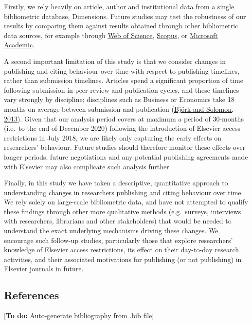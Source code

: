 \documentclass[
]{article}
\begin{document}
Firstly, we rely heavily on article, author and institutional data from a single bibliometric database, Dimensions. Future studies may test the robustness of our results by comparing them against results obtained through other bibliometric data sources, for example through \href{https://www.webofknowledge.com/}{Web of Science}, \href{https://www.scopus.com}{Scopus}, or \href{https://academic.microsoft.com}{Microsoft Academic}.

A second important limitation of this study is that we consider changes in publishing and citing behaviour over time with respect to publishing timelines, rather than submission timelines. Articles spend a significant proportion of time following submission in peer-review and publication cycles, and these timelines vary strongly by discipline; disciplines such as Business or Economics take 18 months on average between submission and publication (\href{https://doi.org/10.1016/j.joi.2013.09.001}{Björk and Solomon, 2013}). Given that our analysis period covers at maximum a period of 30-months (i.e.~to the end of December 2020) following the introduction of Elsevier access restrictions in July 2018, we are likely only capturing the early effects on researchers' behaviour. Future studies should therefore monitor these effects over longer periods; future negotiations and any potential publishing agreements made with Elsevier may also complicate such analysis further.

Finally, in this study we have taken a descriptive, quantitative approach to understanding changes in researchers publishing and citing behaviour over time. We rely solely on large-scale bibliometric data, and have not attempted to qualify these findings through other more qualitative methods (e.g.~surveys, interviews with researchers, librarians and other stakeholders) that would be needed to understand the exact underlying mechanisms driving these changes. We encourage such follow-up studies, particularly those that explore researchers' knowledge of Elsevier access restrictions, its effect on their day-to-day research activities, and their associated motivations for publishing (or not publishing) in Elsevier journals in future.

\hypertarget{references}{%
\subsection{References}\label{references}}

{[}\textbf{To do:} Auto-generate bibliography from .bib file{]}
\end{document}

